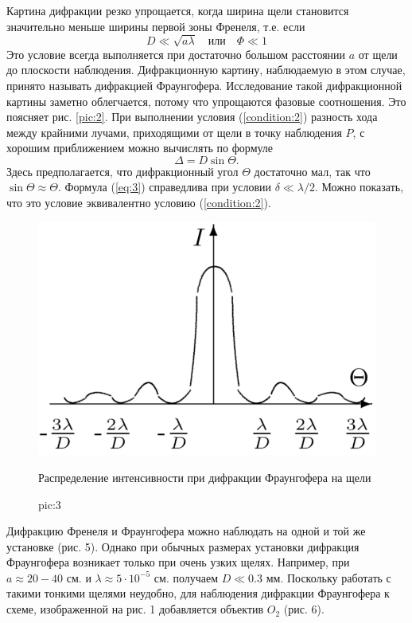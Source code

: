 \documentclass[a4paper, 12pt]{article}
\begin{document}
	Картина дифракции резко упрощается, когда ширина щели становится значительно меньше ширины первой зоны Френеля, т.е. если
	\begin{equation}
		D\ll\sqrt{a\lambda}\quad\text{или}\quad\Phi\ll 1
		\label{condition:2}
	\end{equation}
	Это условие всегда выполняется при достаточно большом расстоянии $a$ от щели до плоскости наблюдения. Дифракционную картину, наблюдаемую в этом случае, принято называть дифракцией Фраунгофера. Исследование такой дифракционной картины заметно облегчается, потому что упрощаются фазовые соотношения. Это поясняет рис. \ref{pic:2}. При выполнении условия (\ref{condition:2}) разность хода между крайними лучами, приходящими от щели в точку наблюдения $P$, с хорошим приближением можно вычислять по формуле
	\begin{equation}
		\Delta=D\sin\Theta.
		\label{eq:3}
	\end{equation}
	Здесь предполагается, что дифракционный угол $\Theta$ достаточно мал, так что $\sin\Theta\approx\Theta$. Формула (\ref{eq:3}) справедлива при условии $\delta\ll\lambda/2$. Можно показать, что это условие эквивалентно условию (\ref{condition:2}).\par
	\begin{figure}
		\includegraphics[scale=0.25]{Fig31.png}
		\caption{Распределение интенсивности при дифракции Фраунгофера на щели}
		\caption{pic:3}
	\end{figure}
	Дифракцию Френеля и Фраунгофера можно наблюдать на одной и той же установке (рис. 5). Однако при обычных размерах установки дифракция Фраунгофера возникает только при очень узких щелях. Например, при $a\approx20-40$ см. и $\lambda\approx5\cdot10^{-5}$ см. получаем $D\ll0.3$ мм. Поскольку работать с такими тонкими щелями неудобно, для наблюдения дифракции Фраунгофера к схеме, изображенной на рис. 1 добавляется объектив $O_2$ (рис. 6).\par
\end{document}
